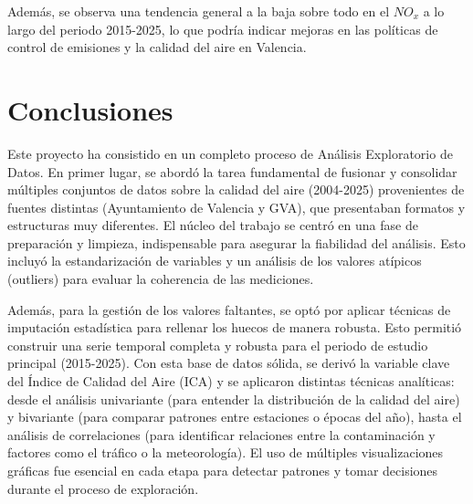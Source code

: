 \documentclass[,,,moreauthors,pdftex]{Definitions/mdpi}
\begin{document}
Además, se observa una tendencia general a la baja sobre todo en el
\(NO_x\) a lo largo del periodo 2015-2025, lo que podría indicar mejoras
en las políticas de control de emisiones y la calidad del aire en
Valencia.

\section{Conclusiones}\label{conclusiones}

Este proyecto ha consistido en un completo proceso de Análisis
Exploratorio de Datos. En primer lugar, se abordó la tarea fundamental
de fusionar y consolidar múltiples conjuntos de datos sobre la calidad
del aire (2004-2025) provenientes de fuentes distintas (Ayuntamiento de
Valencia y GVA), que presentaban formatos y estructuras muy diferentes.
El núcleo del trabajo se centró en una fase de preparación y limpieza,
indispensable para asegurar la fiabilidad del análisis. Esto incluyó la
estandarización de variables y un análisis de los valores atípicos
(outliers) para evaluar la coherencia de las mediciones.

Además, para la gestión de los valores faltantes, se optó por aplicar
técnicas de imputación estadística para rellenar los huecos de manera
robusta. Esto permitió construir una serie temporal completa y robusta
para el periodo de estudio principal (2015-2025). Con esta base de datos
sólida, se derivó la variable clave del Índice de Calidad del Aire (ICA)
y se aplicaron distintas técnicas analíticas: desde el análisis
univariante (para entender la distribución de la calidad del aire) y
bivariante (para comparar patrones entre estaciones o épocas del año),
hasta el análisis de correlaciones (para identificar relaciones entre la
contaminación y factores como el tráfico o la meteorología). El uso de
múltiples visualizaciones gráficas fue esencial en cada etapa para
detectar patrones y tomar decisiones durante el proceso de exploración.


\vspace{6pt}


\end{document}

